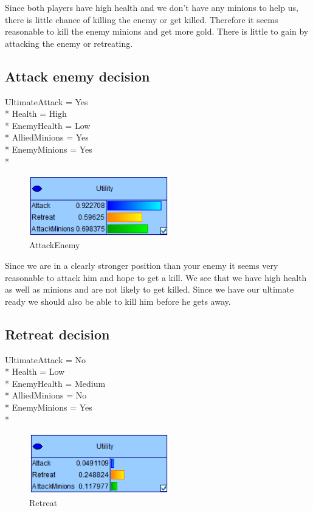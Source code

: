 \documentclass[titlepage]{article}
\begin{document}
Since both players have high health and we don't have any minions to help us, there is little chance of killing the enemy or get killed. Therefore it seems reasonable to kill the enemy minions and get more gold. There is little to gain by attacking the enemy or retreating.

\subsection*{Attack enemy decision}
UltimateAttack = Yes \\*
Health = High \\*
EnemyHealth = Low \\*
AlliedMinions = Yes \\*
EnemyMinions = Yes \\*

\begin{figure}[H] \centering
\includegraphics[width=230px]{atkEnemy.PNG}
\caption{AttackEnemy}
\label{fig:atkEnemy}
\end{figure}

Since we are in a clearly stronger position than your enemy it seems very reasonable to attack him and hope to get a kill. We see that we have high health as well as minions and are not likely to get killed. Since we have our ultimate ready we should also be able to kill him before he gets away.

\subsection*{Retreat decision}
UltimateAttack = No \\*
Health = Low \\*
EnemyHealth = Medium \\*
AlliedMinions = No \\*
EnemyMinions = Yes \\*

\begin{figure}[H] \centering
\includegraphics[width=230px]{Retreat.PNG}
\caption{Retreat}
\label{fig:retreat}
\end{figure}
\end{document}

